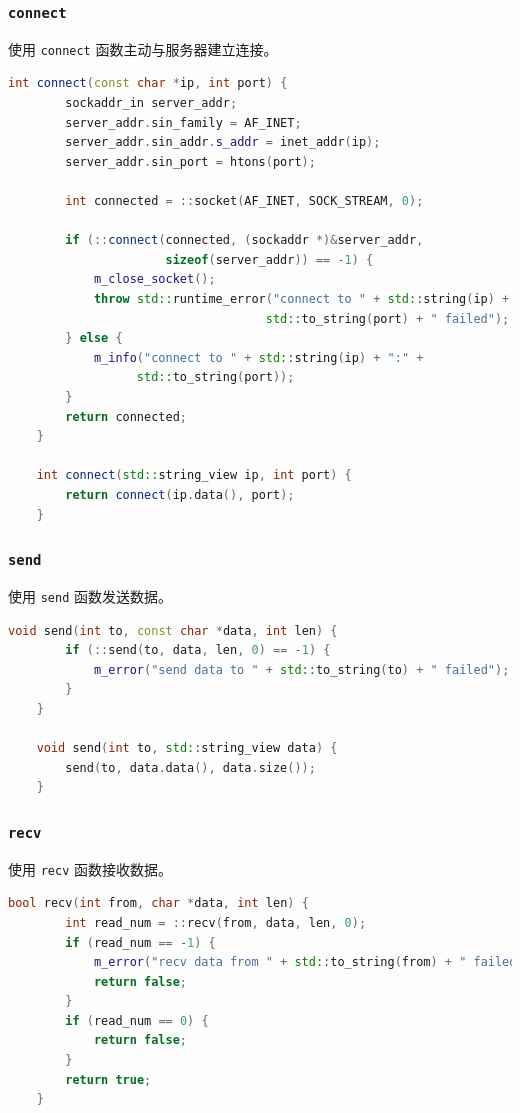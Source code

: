 \documentclass{article}
\begin{document}
\subsubsection{\texttt{connect}}

使用 \texttt{connect} 函数主动与服务器建立连接。

\begin{lstlisting}[language=C++, title=connect]
    int connect(const char *ip, int port) {
        sockaddr_in server_addr;
        server_addr.sin_family = AF_INET;
        server_addr.sin_addr.s_addr = inet_addr(ip);
        server_addr.sin_port = htons(port);

        int connected = ::socket(AF_INET, SOCK_STREAM, 0);

        if (::connect(connected, (sockaddr *)&server_addr,
                      sizeof(server_addr)) == -1) {
            m_close_socket();
            throw std::runtime_error("connect to " + std::string(ip) + ":" +
                                    std::to_string(port) + " failed");
        } else {
            m_info("connect to " + std::string(ip) + ":" +
                  std::to_string(port));
        }
        return connected;
    }

    int connect(std::string_view ip, int port) {
        return connect(ip.data(), port);
    }
\end{lstlisting}

\subsubsection{\texttt{send}}

使用 \texttt{send} 函数发送数据。

\begin{lstlisting}[language=C++, title=send]
    void send(int to, const char *data, int len) {
        if (::send(to, data, len, 0) == -1) {
            m_error("send data to " + std::to_string(to) + " failed");
        }
    }

    void send(int to, std::string_view data) {
        send(to, data.data(), data.size());
    }
\end{lstlisting}

\subsubsection{\texttt{recv}}

使用 \texttt{recv} 函数接收数据。

\begin{lstlisting}[language=C++, title=recv]
    bool recv(int from, char *data, int len) {
        int read_num = ::recv(from, data, len, 0);
        if (read_num == -1) {
            m_error("recv data from " + std::to_string(from) + " failed");
            return false;
        }
        if (read_num == 0) {
            return false;
        }
        return true;
    }
\end{lstlisting}
\end{document}
